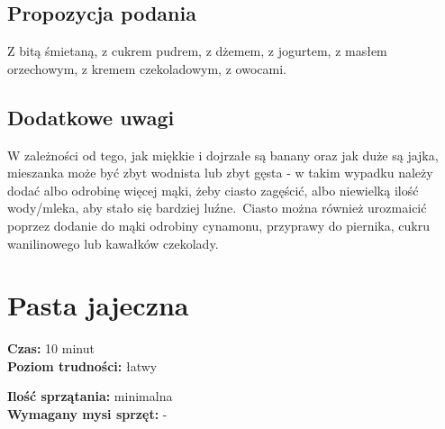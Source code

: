 \documentclass[a4paper,10pt]{book}
\begin{document}
\vspace{0.5cm}

\small \subsection*{Propozycja podania} Z bitą śmietaną, z cukrem pudrem, z dżemem, z jogurtem, z masłem orzechowym, z kremem czekoladowym, z owocami.

\vspace{0.3cm}

\subsection*{Dodatkowe uwagi} W zależności od tego, jak miękkie i dojrzałe są banany oraz jak duże są jajka, mieszanka może być zbyt wodnista lub zbyt gęsta - w takim wypadku należy dodać albo odrobinę więcej mąki, żeby ciasto zagęścić, albo niewielką ilość wody/mleka, aby stało się bardziej luźne.\ Ciasto można również urozmaicić poprzez dodanie do mąki odrobiny cynamonu, przyprawy do piernika, cukru wanilinowego lub kawałków czekolady.

\newpage 

\section{Pasta jajeczna}
\bigskip
\small
\begin{minipage}{0.45\textwidth}
    \noindent \textbf{Czas:} 10 minut \\
    \textbf{Poziom trudności:} łatwy
\end{minipage}
\begin{minipage}{0.45\textwidth}
    \noindent \textbf{Ilość sprzątania:} minimalna\\
    \textbf{Wymagany mysi sprzęt:} -
\end{minipage}
\normalsize
\vspace{0.5cm}
\end{document}
